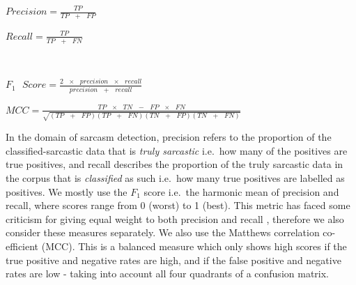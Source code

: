\documentclass[12pt,a4paper]{article}
\begin{document}
\hspace{-30pt}\begin{center}
	\begin{minipage}{0.47\textwidth}
		$Precision =\frac{TP}{TP\text{ } + \text{ }FP}$\\
	\end{minipage}
	\hspace{-30pt}\begin{minipage}{0.47\textwidth}
		$Recall =\frac{TP}{TP\text{ } + \text{ }FN}$\\
	\end{minipage}\\
\end{center}
\vspace{-20pt}
\begin{center}
	\begin{minipage}{0.47\textwidth}
		$F_1\text{ } Score =\frac{2 \text{ }\times\text{ } precision\text{ } \times \text{ }recall}{precision\text{ } + \text{ }recall}$
	\end{minipage}
	\hspace{-30pt}\begin{minipage}{0.47\textwidth}
		$MCC =\frac{TP \text{ } \times \text{ } TN \text{ } - \text{ } FP\text{ } \times \text{ } FN}{\sqrt{(TP \text{ } + \text{ } FP)(TP \text{ } + \text{ } FN)(TN \text{ } + \text{ } FP)(TN \text{ } + \text{ } FN)}}$
	\end{minipage}
\end{center}
\vspace{4pt}

\noindent In the domain of sarcasm detection, precision refers to the proportion of the classified-sarcastic data that is \textit{truly sarcastic} i.e.\ how many of the positives are true positives, and recall describes the proportion of the truly sarcastic data in the corpus that is \textit{classified} as such i.e.\ how many true positives are labelled as positives. We mostly use the $F_{1}$ score i.e.\ the harmonic mean of precision and recall, where scores range from 0 (worst) to 1 (best). This metric has faced some criticism for giving equal weight to both precision and recall \cite{hand2018note}, therefore we also consider these measures separately. We also use the Matthews correlation co-efficient (MCC). This is a balanced measure which only shows high scores if the true positive and negative rates are high, and if the false positive and negative rates are low - taking into account all four quadrants of a confusion matrix.

\end{document}
